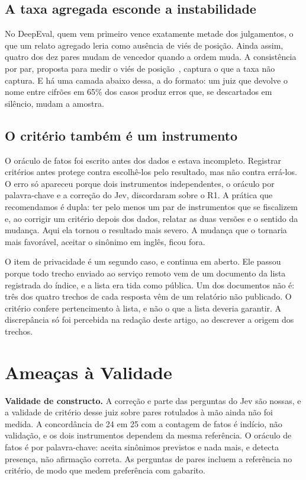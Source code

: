 \documentclass[12pt]{article}
\begin{document}
\subsection{A taxa agregada esconde a instabilidade}

No DeepEval, quem vem primeiro vence exatamente metade dos julgamentos, o que um relato
agregado leria como ausência de viés de posição. Ainda assim, quatro dos dez pares mudam
de vencedor quando a ordem muda. A consistência por par, proposta para medir o viés de
posição~\cite{zheng2023judging,wang2024fair}, captura o que a taxa não captura. E há uma
camada abaixo dessa, a do formato: um juiz que devolve o nome entre cifrões em 65\% dos
casos produz erros que, se descartados em silêncio, mudam a amostra.

\subsection{O critério também é um instrumento}

O oráculo de fatos foi escrito antes dos dados e estava incompleto. Registrar critérios
antes protege contra escolhê-los pelo resultado, mas não contra errá-los. O erro só
apareceu porque dois instrumentos independentes, o oráculo por palavra-chave e a correção
do Jev, discordaram sobre o R1. A prática que recomendamos é dupla: ter pelo menos um par
de instrumentos que se fiscalizem e, ao corrigir um critério depois dos dados, relatar as
duas versões e o sentido da mudança. Aqui ela tornou o resultado mais severo. A mudança
que o tornaria mais favorável, aceitar o sinônimo em inglês, ficou fora.

O item de privacidade é um segundo caso, e continua em aberto. Ele passou porque todo trecho
enviado ao serviço remoto vem de um documento da lista registrada do índice, e a lista era
tida como pública. Um dos documentos não é: três dos quatro trechos de cada resposta vêm de um
relatório não publicado. O critério confere pertencimento à lista, e não o que a lista deveria
garantir. A discrepância só foi percebida na redação deste artigo, ao descrever a origem dos
trechos.

\section{Ameaças à Validade}

\textbf{Validade de constructo.} A correção e parte das perguntas do Jev são nossas, e a
validade de critério desse juiz sobre pares rotulados à mão ainda não foi medida. A
concordância de 24 em 25 com a contagem de fatos é indício, não validação, e os dois
instrumentos dependem da mesma referência. O oráculo de fatos é por palavra-chave: aceita
sinônimos previstos e nada mais, e detecta presença, não afirmação correta. As perguntas
de pares incluem a referência no critério, de modo que medem preferência com gabarito.
\end{document}

